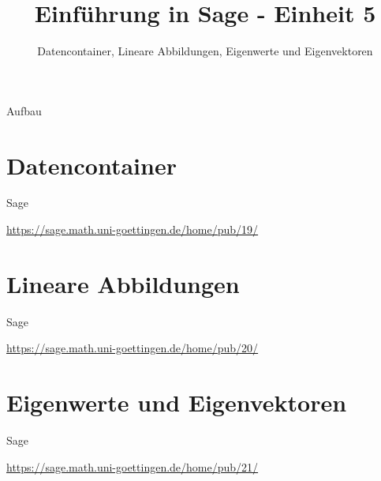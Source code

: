 \documentclass[hyperref={xetex}]{beamer}
\title{Einführung in Sage - Einheit 5}
\subtitle{Datencontainer, Lineare Abbildungen, Eigenwerte und Eigenvektoren}
\begin{document}
\titlepage

\begin{frame}{Aufbau}
\tableofcontents
\end{frame}

\section{Datencontainer}

\begin{frame}{Sage}
    \begin{center}
       \url{https://sage.math.uni-goettingen.de/home/pub/19/}
    \end{center}
\end{frame}



\section{Lineare Abbildungen}


\begin{frame}{Sage}
    \begin{center}
        \url{https://sage.math.uni-goettingen.de/home/pub/20/}
    \end{center}
\end{frame}

\section{Eigenwerte und Eigenvektoren}




\begin{frame}{Sage}
    \begin{center}
        \url{https://sage.math.uni-goettingen.de/home/pub/21/}
    \end{center}
\end{frame}
\end{document}
